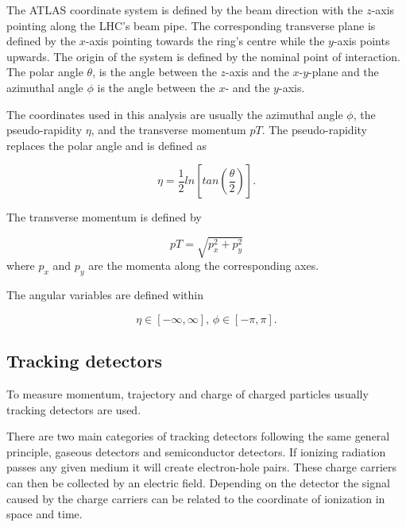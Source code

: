 The ATLAS coordinate system is defined by the beam direction with the $z$-axis pointing along the LHC's beam pipe. The corresponding transverse plane is defined by the $x$-axis pointing towards the ring's centre while the $y$-axis points upwards. The origin of the system is defined by the nominal point of interaction. The polar angle $\theta$, is the angle between the $z$-axis and the $x$-$y$-plane and the azimuthal angle $\phi$ is the angle between the $x$- and the $y$-axis.

The coordinates used in this analysis are usually the azimuthal angle $\phi$, the pseudo-rapidity $\eta$, and the transverse momentum $pT$. The pseudo-rapidity replaces the polar angle and is defined as

\begin{equation}
\eta = \frac{1}{2} ln\left[ tan\left(\frac{\theta}{2}\right)\right].
\end{equation}

The transverse momentum is defined by

\begin{equation}
pT = \sqrt{p_x^2 + p_y^2}
\end{equation}
where $p_x$ and $p_y$ are the momenta along the corresponding axes. 

The angular variables are defined within

\begin{equation}
\eta \in [-\infty,\infty],\,
\phi \in [-\pi,\pi].
\end{equation}
\subsection{Tracking detectors}

To measure momentum, trajectory and charge of charged particles usually tracking detectors are used.

There are two main categories of tracking detectors following the same general principle, gaseous detectors and semiconductor detectors. If ionizing radiation passes any given medium it will create electron-hole pairs. These charge carriers can then be collected by an electric field. Depending on the detector the signal caused by the charge carriers can be related to the coordinate of ionization in space and time.

